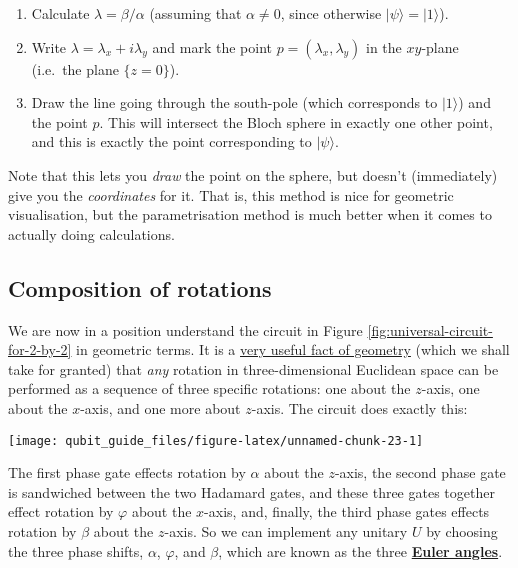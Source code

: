\documentclass[fleqn]{article}
\providecommand{\tightlist}{%
  \setlength{\itemsep}{0pt}\setlength{\parskip}{0pt}}
\begin{document}
\begin{enumerate}
\def\labelenumi{\arabic{enumi}.}
\tightlist
\item
  Calculate \(\lambda=\beta/\alpha\) (assuming that \(\alpha\neq0\), since otherwise \(|\psi\rangle=|1\rangle\)).
\item
  Write \(\lambda=\lambda_x+i\lambda_y\) and mark the point \(p=(\lambda_x,\lambda_y)\) in the \(xy\)-plane (i.e.~the plane \(\{z=0\}\)).
\item
  Draw the line going through the south-pole (which corresponds to \(|1\rangle\)) and the point \(p\). This will intersect the Bloch sphere in exactly one other point, and this is exactly the point corresponding to \(|\psi\rangle\).
\end{enumerate}

Note that this lets you \emph{draw} the point on the sphere, but doesn't (immediately) give you the \emph{coordinates} for it.
That is, this method is nice for geometric visualisation, but the parametrisation method is much better when it comes to actually doing calculations.

\hypertarget{composition-of-rotations}{%
\subsection{Composition of rotations}\label{composition-of-rotations}}

We are now in a position understand the circuit in Figure \ref{fig:universal-circuit-for-2-by-2} in geometric terms.
It is a \href{https://en.wikipedia.org/wiki/Euler_angles\#Conventions_by_extrinsic_rotations}{very useful fact of geometry} (which we shall take for granted) that \emph{any} rotation in three-dimensional Euclidean space can be performed as a sequence of three specific rotations: one about the \(z\)-axis, one about the \(x\)-axis, and one more about \(z\)-axis.
The circuit does exactly this:

\begin{center}\texttt{[image: qubit\_guide\_files/figure-latex/unnamed-chunk-23-1]} \end{center}

The first phase gate effects rotation by \(\alpha\) about the \(z\)-axis, the second phase gate is sandwiched between the two Hadamard gates, and these three gates together effect rotation by \(\varphi\) about the \(x\)-axis, and, finally, the third phase gates effects rotation by \(\beta\) about the \(z\)-axis.
So we can implement any unitary \(U\) by choosing the three phase shifts, \(\alpha\), \(\varphi\), and \(\beta\), which are known as the three \href{https://en.wikipedia.org/wiki/Euler_angles}{\textbf{Euler angles}}.
\end{document}

